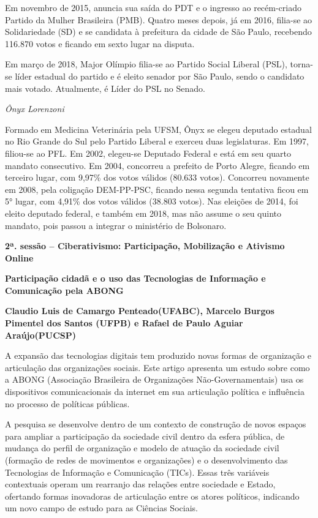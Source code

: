 Em novembro de 2015, anuncia sua saída do PDT e o ingresso ao
recém-criado Partido da Mulher Brasileira (PMB). Quatro meses depois, já
em 2016, filia-se ao Solidariedade (SD) e se candidata à prefeitura da
cidade de São Paulo, recebendo 116.870 votos e ficando em sexto lugar na
disputa.

Em março de 2018, Major Olímpio filia-se ao Partido Social Liberal
(PSL), torna-se líder estadual do partido e é eleito senador por São
Paulo, sendo o candidato mais votado. Atualmente, é Líder do PSL no
Senado.

\emph{Ônyx Lorenzoni}

Formado em Medicina Veterinária pela UFSM, Ônyx se elegeu deputado
estadual no Rio Grande do Sul pelo Partido Liberal e exerceu duas
legislaturas. Em 1997, filiou-se ao PFL. Em 2002, elegeu-se Deputado
Federal e está em seu quarto mandato consecutivo. Em 2004, concorreu a
prefeito de Porto Alegre, ficando em terceiro lugar, com 9,97\% dos
votos válidos (80.633 votos). Concorreu novamente em 2008, pela
coligação DEM-PP-PSC, ficando nessa segunda tentativa ficou em 5° lugar,
com 4,91\% dos votos válidos (38.803 votos). Nas eleições de 2014, foi
eleito deputado federal, e também em 2018, mas não assume o seu quinto
mandato, pois passou a integrar o ministério de Bolsonaro.

\textbf{2ª. sessão -- Ciberativismo: Participação, Mobilização e
Ativismo Online}

\textbf{Participação cidadã e o uso das Tecnologias de Informação e
Comunicação pela ABONG }

\textbf{Claudio Luis de Camargo Penteado(UFABC), Marcelo Burgos Pimentel
dos Santos (UFPB) e Rafael de Paulo Aguiar Araújo(PUCSP)}

A expansão das tecnologias digitais tem produzido novas formas de
organização e articulação das organizações sociais. Este artigo
apresenta um estudo sobre como a ABONG (Associação Brasileira de
Organizações Não-Governamentais) usa os dispositivos comunicacionais da
internet em sua articulação política e influência no processo de
políticas públicas.

A pesquisa se desenvolve dentro de um contexto de construção de novos
espaços para ampliar a participação da sociedade civil dentro da esfera
pública, de mudança do perfil de organização e modelo de atuação da
sociedade civil (formação de redes de movimentos e organizações) e o
desenvolvimento das Tecnologias de Informação e Comunicação (TICs).
Essas três variáveis contextuais operam um rearranjo das relações entre
sociedade e Estado, ofertando formas inovadoras de articulação entre os
atores políticos, indicando um novo campo de estudo para as Ciências
Sociais.

